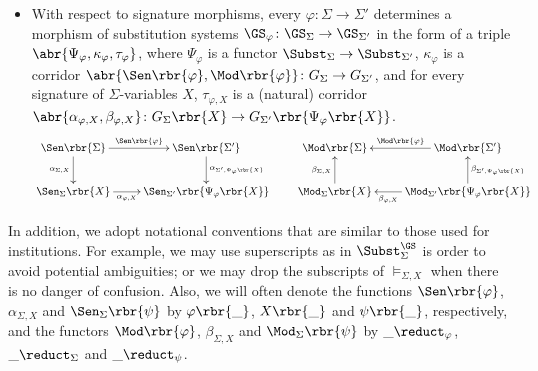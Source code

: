 \documentclass{LMCS}
\begin{document}
\begin{itemize}[label=$-$]
  \item With respect to signature morphisms, every \(\varphi \colon \Sigma \to \Sigma'\) determines a morphism of substitution systems \(\GS_{\varphi} \colon \GS_{\Sigma} \to \GS_{\Sigma'}\) in the form of a triple \(\abr{\Psi_{\varphi}, \kappa_{\varphi}, \tau_{\varphi}}\), where \(\Psi_{\varphi}\) is a functor \(\Subst_{\Sigma} \to \Subst_{\Sigma'}\), \(\kappa_{\varphi}\) is a corridor \(\abr{\Sen\rbr{\varphi}, \Mod\rbr{\varphi}} \colon G_{\Sigma} \to G_{\Sigma'}\), and for every signature of \(\Sigma\)\nb-variables \(X\), \(\tau_{\varphi, X}\) is a (natural) corridor \(\abr{\alpha_{\varphi, X}, \beta_{\varphi, X}} \colon G_{\Sigma}\rbr{X} \to G_{\Sigma'}\rbr{\Psi_{\varphi}\rbr{X}}\).
    \[
    \xymatrix {
      {\Sen\rbr{\Sigma}}
      \ar [r] ^-{\Sen\rbr{\varphi}}
      \ar [d] _{\alpha_{\Sigma, X}}
      & {\Sen\rbr{\Sigma'}}
      \ar [d] ^{\alpha_{\Sigma', \Psi_{\varphi}\rbr{X}}}
      \\
      {\Sen_{\Sigma}\rbr{X}}
      \ar [r] _-{\alpha_{\varphi, X}}
      & {\Sen_{\Sigma'}\rbr{\Psi_{\varphi}\rbr{X}}}
    }
    \qquad
    \xymatrix {
      {\Mod\rbr{\Sigma}}
      & {\Mod\rbr{\Sigma'}}
      \ar [l] _-{\Mod\rbr{\varphi}}
      \\
      {\Mod_{\Sigma}\rbr{X}}
      \ar [u] ^{\beta_{\Sigma, X}}
      & {\Mod_{\Sigma'}\rbr{\Psi_{\varphi}\rbr{X}}}
      \ar [u] _{\beta_{\Sigma', \Psi_{\varphi}\rbr{X}}}
      \ar [l] ^-{\beta_{\varphi, X}}
    }
    \]

  \end{itemize}
 \noindent In addition, we adopt notational conventions that are similar to those used for institutions.
  For example, we may use superscripts as in \(\Subst^{\GS}_{\Sigma}\) is order to avoid potential ambiguities; or we may drop the subscripts of \(\models_{\Sigma, X}\) when there is no danger of confusion.
  Also, we will often denote the functions \(\Sen\rbr{\varphi}\), \(\alpha_{\Sigma, X}\) and \(\Sen_{\Sigma}\rbr{\psi}\) by \(\varphi\rbr{\_}\), \(X\rbr{\_}\) and \(\psi\rbr{\_}\), respectively, and the functors \(\Mod\rbr{\varphi}\), \(\beta_{\Sigma, X}\) and \(\Mod_{\Sigma}\rbr{\psi}\) by \(\_ \reduct_{\varphi}\), \(\_ \reduct_{\Sigma}\) and \(\_ \reduct_{\psi}\).
\end{document}
